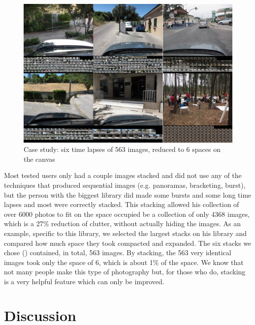 \begin{figure}
	\vspace{-20pt}
	\begin{center}
		\includegraphics[width=\linewidth]{Figures/filcab-time-lapse-563-imgs-to-6.png}
	\end{center}
	\vspace{-20pt}
	\caption{Case study: six time lapses of 563 images, reduced to 6 spaces on the canvas}
	\vspace{-5pt}
	\label{fig:filcab:stacks}
\end{figure}

Most tested users only had a couple images stacked and did not use any of the techniques that produced sequential images (e.g. panoramas, bracketing, burst), but the person with the biggest library did made some bursts and some long time lapses and most were correctly stacked. This stacking allowed his collection of over 6000 photos to fit on the space occupied be a collection of only 4368 images, which is a 27\% reduction of clutter, without actually hiding the images. As an example, specific to this library, we selected the largest stacks on his library and compared how much space they took compacted and expanded. The six stacks we chose () contained, in total, 563 images. By stacking, the 563 very identical images took only the space of 6, which is about 1\% of the space. We know that not many people make this type of photography but, for those who do, stacking is a very helpful feature which can only be improved.






\section{Discussion}

